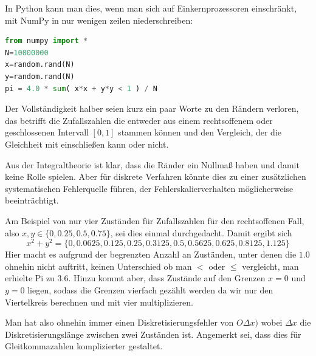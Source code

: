 In Python kann man dies, wenn man sich auf Einkernprozessoren einschränkt, mit NumPy\cite{numpy} in nur wenigen zeilen niederschreiben:
\begin{lstlisting}[language=python]
from numpy import *
N=10000000
x=random.rand(N)
y=random.rand(N)
pi = 4.0 * sum( x*x + y*y < 1 ) / N
\end{lstlisting}\vspace{-1.5\baselineskip}

Der Vollständigkeit halber seien kurz ein paar Worte zu den Rändern verloren, das betrifft die Zufallszahlen die entweder aus einem rechtsoffenem oder geschlossenen Intervall $[0,1]$ stammen können und den Vergleich, der die Gleichheit mit einschließen kann oder nicht.

Aus der Integraltheorie ist klar, dass die Ränder ein Nullmaß haben und damit keine Rolle spielen. Aber für diskrete Verfahren könnte dies zu einer zusätzlichen systematischen Fehlerquelle führen, der Fehlerskalierverhalten möglicherweise beeinträchtigt.

Am Beispiel von nur vier Zuständen für Zufallszahlen für den rechtsoffenen Fall, also $x,y\in \lbrace 0,0.25,0.5,0.75 \rbrace$, sei dies einmal durchgedacht. Damit ergibt sich
\begin{equation}
	x^2+y^2 = \lbrace 0, 0.0625, 0.125, 0.25, 0.3125, 0.5, 0.5625, 0.625, 0.8125, 1.125 \rbrace
\end{equation}
Hier macht es aufgrund der begrenzten Anzahl an Zuständen, unter denen die $1.0$ ohnehin nicht auftritt, keinen Unterschied ob man $<$ oder $\leq$ vergleicht, man erhielte Pi zu $3.6$.
Hinzu kommt aber, dass Zustände auf den Grenzen $x=0$ und $y=0$ liegen, sodass die Grenzen vierfach gezählt werden da wir nur den Viertelkreis berechnen und mit vier multiplizieren.

Man hat also ohnehin immer einen Diskretisierungsfehler von $O\Delta x)$ wobei $\Delta x$ die Diskretisierungslänge zwischen zwei Zuständen ist. Angemerkt sei, dass dies für Gleitkommazahlen komplizierter gestaltet.

